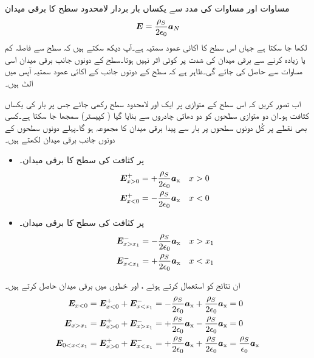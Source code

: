 مساوات  اور مساوات  کی مدد سے یکساں بار بردار لامحدود سطح کا برقی میدان
\begin{align}\label{مساوات_کولمب_لامحدود_سطح_کی_برقی-میدان}
{\ensuremath{{\boldsymbol{E}}}}=\frac{\rho_S}{2 \epsilon_0}{{\boldsymbol{a}}}_N
\end{align}
لکھا جا سکتا ہے جہاں  اس سطح کا  اکائی  عمود سمتیہ ہے۔آپ دیکھ سکتے ہیں کہ سطح سے فاصلہ کم یا زیادہ کرنے سے برقی میدان کی شدت پر کوئی اثر نہیں ہوتا۔سطح کے دونوں جانب برقی میدان اسی مساوات سے حاصل کی جائے گی۔ظاہر ہے کہ سطح کے دونوں جانب کے اکائی عمود سمتیہ آپس میں الٹ ہیں۔

اب تصور کریں کہ اس سطح کے متوازی  پر  ایک اور لامحدود سطح  رکھی جائے جس پر بار کی یکساں کثافت  ہو۔ان دو متوازی سطحوں کو دو دھاتی چادروں سے بنایا گیا  ( کپیسٹر) سمجھا جا سکتا ہے۔کسی بھی نقطے پر کُل  دونوں سطحوں پر بار سے پیدا برقی میدان کا مجموعہ ہو گا۔پہلے دونوں سطحوں کے دونوں جانب برقی میدان لکھتے ہیں۔ 
\begin{itemize}
\item
{} پر  کثافت کی سطح کا برقی میدان۔
\begin{align*}
{\ensuremath{{\boldsymbol{E}}}}_{x>0}^{+}&=+\frac{\rho_S}{2\epsilon_0} {\boldsymbol{a}}_{\textup{x}} &x>0\\
{{\boldsymbol{E}}}_{x<0}^{+}&=-\frac{\rho_S}{2\epsilon_0} {\boldsymbol{a}}_{\textup{x}} &x<0
\end{align*} 
\item
{} پر  کثافت کی سطح کا برقی میدان۔
\begin{align*}
{\ensuremath{{\boldsymbol{E}}}}_{x>x_1}^{-}&=-\frac{\rho_S}{2\epsilon_0} {\boldsymbol{a}}_{\textup{x}} &x>x_1\\
{{\boldsymbol{E}}}_{x<x_1}^{-}&=+\frac{\rho_S}{2\epsilon_0} {\boldsymbol{a}}_{\textup{x}} &x<x_1
\end{align*} 

\end{itemize}
ان نتائج کو استعمال کرتے ہوئے ، اور  خطوں میں برقی میدان حاصل کرتے ہیں۔
\begin{gather}
\begin{aligned}
{\ensuremath{{\boldsymbol{E}}}}_{x<0}&={{\boldsymbol{E}}}_{x<0}^{+} +{{\boldsymbol{E}}}_{x<x_1}^-=-\frac{\rho_S}{2\epsilon_0} {\boldsymbol{a}}_{\textup{x}}+\frac{\rho_S}{2\epsilon_0} {\boldsymbol{a}}_{\textup{x}} =0\\
{{\boldsymbol{E}}}_{x>x_1}&={{\boldsymbol{E}}}_{x>0}^{+} +{{\boldsymbol{E}}}_{x>x_1}^{-}=+\frac{\rho_S}{2\epsilon_0} {\boldsymbol{a}}_{\textup{x}}-\frac{\rho_S}{2\epsilon_0} {\boldsymbol{a}}_{\textup{x}}=0\\
{{\boldsymbol{E}}}_{0<x<x_1}&={{\boldsymbol{E}}}_{x>0}^{+}+{{\boldsymbol{E}}}_{x<x_1}^{-}=+\frac{\rho_S}{2\epsilon_0} {\boldsymbol{a}}_{\textup{x}}+\frac{\rho_S}{2\epsilon_0} {\boldsymbol{a}}_{\textup{x}} =\frac{\rho_S}{\epsilon_0} {\boldsymbol{a}}_{\textup{x}}
\end{aligned}
\end{gather}

